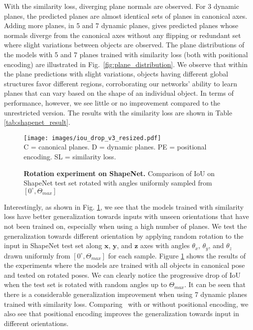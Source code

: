 \documentclass[10pt,twocolumn,letterpaper]{article}
\begin{document}
With the similarity loss, diverging plane normals are observed. For 3 dynamic planes, the predicted planes are almost identical sets of planes in canonical axes. Adding more planes, \eg in 5 and 7 dynamic planes, gives predicted planes whose normals diverge from the canonical axes without any flipping or redundant set where slight variations between objects are observed. The plane distributions of the models with 5 and 7 planes trained with similarity loss (both with positional encoding) are illustrated in Fig.~\ref{fig:plane_distribution}. We observe that within the plane predictions with slight variations, objects having different global structures favor different regions, corroborating our networks' ability to learn planes that can vary based on the shape of an individual object. In terms of performance, however, we see little or no improvement compared to the unrestricted version. The results with the similarity loss are shown in Table \ref{tab:shapenet_result}.

\begin{figure}[!h]
\centering
\texttt{[image: images/iou\_drop\_v3\_resized.pdf]}\\
\footnotesize{C = canonical planes. D = dynamic planes. PE = positional encoding. SL = similarity loss.}
\caption{\textbf{Rotation experiment on ShapeNet.} Comparison of IoU on ShapeNet test set rotated with angles uniformly sampled from $[0^{\circ}, \Theta_{max}]$ }
\label{fig:iou_drop}
\end{figure}

Interestingly, as shown in Fig. \ref{fig:iou_drop}, we see that the models trained with similarity loss have better generalization towards inputs with unseen orientations that have not been trained on, especially when using a high number of planes. We test the generalization towards different orientation by applying random rotation to the input in ShapeNet test set along $\mathbf{x}$, $\mathbf{y}$, and $\mathbf{z}$ axes with angles $\theta_x$, $\theta_y$, and $\theta_z$ drawn uniformly from $[0^{\circ}, \Theta_{max}]$ for each sample. Figure \ref{fig:iou_drop} shows the results of the experiments where the models are trained with all objects in canonical pose and tested on rotated poses. We can clearly notice the progressive drop of IoU when the test set is rotated with random angles up to $\Theta_{max}$. It can be seen that there is a considerable generalization improvement when using 7 dynamic planes trained with similarity loss. Comparing~\cite{peng2020convolutional} with or without positional encoding, we also see that positional encoding improves the generalization towards input in different orientations.
\end{document}
